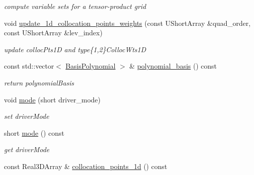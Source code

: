 \begin{DoxyCompactItemize}
\begin{DoxyCompactList}\small\item\em compute variable sets for a tensor-\/product grid \end{DoxyCompactList}\item 
void \hyperlink{classPecos_1_1IntegrationDriver_a8c5ab9e65aea318db31dce4410e4b909}{update\+\_\+1d\+\_\+collocation\+\_\+points\+\_\+weights} (const U\+Short\+Array \&quad\+\_\+order, const U\+Short\+Array \&lev\+\_\+index)\label{classPecos_1_1IntegrationDriver_a8c5ab9e65aea318db31dce4410e4b909}

\begin{DoxyCompactList}\small\item\em update colloc\+Pts1D and type\{1,2\}Colloc\+Wts1D \end{DoxyCompactList}\item 
const std\+::vector$<$ \hyperlink{classPecos_1_1BasisPolynomial}{Basis\+Polynomial} $>$ \& \hyperlink{classPecos_1_1IntegrationDriver_a7282b8c27142b1b15cd79922c3f55e19}{polynomial\+\_\+basis} () const \label{classPecos_1_1IntegrationDriver_a7282b8c27142b1b15cd79922c3f55e19}

\begin{DoxyCompactList}\small\item\em return polynomial\+Basis \end{DoxyCompactList}\item 
void \hyperlink{classPecos_1_1IntegrationDriver_ad990c7645a566210244477bec9e46b6d}{mode} (short driver\+\_\+mode)\label{classPecos_1_1IntegrationDriver_ad990c7645a566210244477bec9e46b6d}

\begin{DoxyCompactList}\small\item\em set driver\+Mode \end{DoxyCompactList}\item 
short \hyperlink{classPecos_1_1IntegrationDriver_a1dd1bfd9a642c71eec4df843fd722aad}{mode} () const \label{classPecos_1_1IntegrationDriver_a1dd1bfd9a642c71eec4df843fd722aad}

\begin{DoxyCompactList}\small\item\em get driver\+Mode \end{DoxyCompactList}\item 
const Real3\+D\+Array \& \hyperlink{classPecos_1_1IntegrationDriver_a488137c62d71cae818431be7e1eeab3b}{collocation\+\_\+points\+\_\+1d} () const \label{classPecos_1_1IntegrationDriver_a488137c62d71cae818431be7e1eeab3b}


\end{DoxyCompactItemize}
